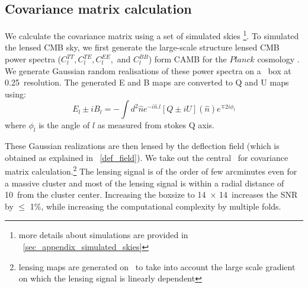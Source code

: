 \subsection{Covariance matrix calculation}
\label{sec_covmat}

 We calculate the covariance matrix using a set of simulated skies \footnote{more details about simulations are provided in ~\ref{sec_appendix_simulated_skies}}. 
 To simulated the lensed CMB sky, we first generate the large-scale structure lensed CMB power spectra ($C^{TT}_{l}, C^{TE}_{l}, C^{EE}_{l},$ and $C^{BB}_{l}$) form CAMB for the $Planck$ cosmology \citep{planck15-13}.  
 We generate Gaussian random realisations of these power spectra on a \mediumboxsize\ box at 0.25\am\ resolution. 
The generated E and B maps are converted to Q and U maps using:
 \begin{equation}
 E_{l} \pm i B_{l} = - \int d^{2} \hat{n} e^{-i \hat{n}. l}[Q \pm iU] (\hat{n}) e^{\mp 2 i\phi_{l}}  
 \label{eq:coord_trans}
 \end{equation}
 where $\phi_{l}$ is the angle of $l$ as measured from stokes Q axis.
 

 These Gaussian realizations are then lensed by the deflection field (which is obtained as explained in ~\ref{def_field}). 
 We take out the central \smallboxsize\ for covariance matrix calculation.\footnote{lensing maps are generated on \mediumboxsize\ to take into account the large scale gradient on which the lensing signal is linearly dependent}
 The lensing signal is of the order of few arcminutes even for a massive cluster and most of the lensing signal is within a radial distance of  10\am\ from the cluster center.
Increasing the boxsize to 14\am\ $\times$ 14\am\ increases the SNR by $\le$ 1\%, while increasing the computational complexity by multiple folds.

